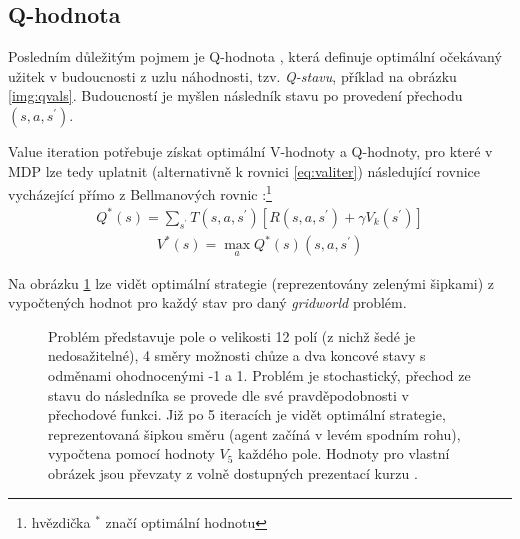 \subsection*{Q-hodnota}
\label{teorie:valiterq}
Posledním důležitým pojmem je Q-hodnota \cite{RLIntro}, která definuje optimální očekávaný užitek v budoucnosti z uzlu náhodnosti, tzv. \textit{Q-stavu}, příklad na obrázku \ref{img:qvals}. Budoucností je myšlen následník stavu po provedení přechodu $(s,a,s^\prime)$.

Value iteration potřebuje získat optimální V-hodnoty a Q-hodnoty, pro které v MDP lze tedy uplatnit (alternativně k rovnici \ref{eq:valiter}) následující rovnice vycházející přímo z Bellmanových rovnic \cite{mas}:\footnote{hvězdička $^{*}$ značí optimální hodnotu}
\begin{align}
\label{eq:valiter21}
Q^*(s) = \sum_{s^\prime}T(s,a,s^\prime) \left[R(s,a,s^\prime)+\gamma V_k(s^\prime) \right]
\end{align}
\begin{align}
\label{eq:valiter22}
V^*(s) = \max_a Q^*(s) (s,a,s^\prime)
\end{align}

Na obrázku \ref{img:policy} lze vidět optimální strategie (reprezentovány zelenými šipkami) z vypočtených hodnot pro každý stav pro daný \textit{gridworld} problém.

\begin{figure}[!htbp]
\begin{center}
  \caption{Problém představuje pole o velikosti 12 polí (z nichž šedé je nedosažitelné), 4 směry možnosti chůze a dva koncové stavy s odměnami ohodnocenými -1 a 1. Problém je stochastický, přechod ze stavu do následníka se provede dle své pravděpodobnosti v přechodové funkci. Již po 5 iteracích je vidět optimální strategie, reprezentovaná šipkou směru (agent začíná v levém spodním rohu), vypočtena pomocí hodnoty $V_{5}$ každého pole. Hodnoty pro vlastní obrázek jsou převzaty z volně dostupných prezentací kurzu \cite{berkeley}.}
  \label{img:policy}
\end{center}
\end{figure}

